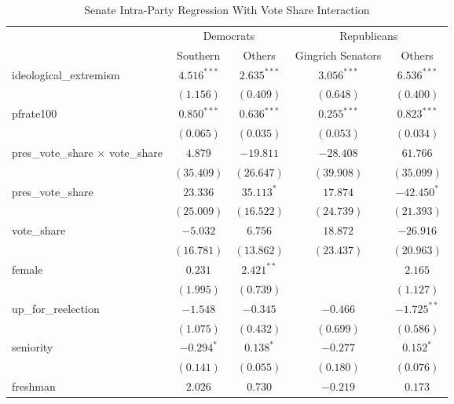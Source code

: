 \documentclass[12pt]{article}
\begin{document}
\begin{table}[H]
	\begin{center}
		\caption{Senate Intra-Party Regression With Vote Share Interaction}
		\begin{tabular}{l c c c c }
			\hline
			& \multicolumn{2}{c}{Democrats} & \multicolumn{2}{c}{Republicans} \\
			\cline{2-5}
			& Southern & Others & Gingrich Senators & Others \\
			\hline
			ideological\_extremism        & $4.516^{***}$ & $2.635^{***}$ & $3.056^{***}$  & $6.536^{***}$ \\
			& $(1.156)$     & $(0.409)$     & $(0.648)$      & $(0.400)$     \\
			pfrate100                     & $0.850^{***}$ & $0.636^{***}$ & $0.255^{***}$  & $0.823^{***}$ \\
			& $(0.065)$     & $(0.035)$     & $(0.053)$      & $(0.034)$     \\
			pres\_vote\_share $ \times $ vote\_share & $4.879$       & $-19.811$     & $-28.408$      & $61.766$      \\
			& $(35.409)$    & $(26.647)$    & $(39.908)$     & $(35.099)$    \\
			pres\_vote\_share             & $23.336$      & $35.113^{*}$  & $17.874$       & $-42.450^{*}$ \\
			& $(25.009)$    & $(16.522)$    & $(24.739)$     & $(21.393)$    \\
			vote\_share                   & $-5.032$      & $6.756$       & $18.872$       & $-26.916$     \\
			& $(16.781)$    & $(13.862)$    & $(23.437)$     & $(20.963)$    \\
			female                        & $0.231$       & $2.421^{**}$  &                & $2.165$       \\
			& $(1.995)$     & $(0.739)$     &                & $(1.127)$     \\
			up\_for\_reelection           & $-1.548$      & $-0.345$      & $-0.466$       & $-1.725^{**}$ \\
			& $(1.075)$     & $(0.432)$     & $(0.699)$      & $(0.586)$     \\
			seniority                     & $-0.294^{*}$  & $0.138^{*}$   & $-0.277$       & $0.152^{*}$   \\
			& $(0.141)$     & $(0.055)$     & $(0.180)$      & $(0.076)$     \\
			freshman                      & $2.026$       & $0.730$       & $-0.219$       & $0.173$       \\

\end{tabular}
\end{center}
\end{table}
\end{document}
